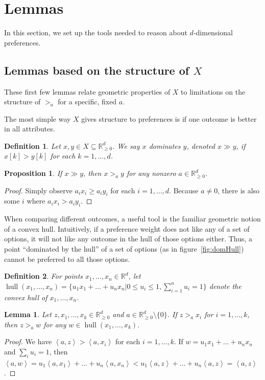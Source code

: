\documentclass[12pt]{article}
\newtheorem*{definition}{Definition}
\newtheorem{proposition}[theorem]{Proposition}
\newtheorem{lemma}[theorem]{Lemma}
\newcommand{\R}{\mathbb{R}}
\newcommand{\Rgz}{\mathbb{R}_{\ge 0}}
\newcommand{\ip}[2]{\left\langle{#1},{#2}\right\rangle}
\DeclareMathOperator*{\hull}{hull}
\newcommand{\1}[1]{\mathds{1}[{#1}]}
\begin{document}
\section{Lemmas}
  In this section, we set up the tools needed to reason about 
  $d$-dimensional preferences.

  \subsection{Lemmas based on the structure of $X$}
    These first few lemmas relate geometric properties of $X$ to
    limitations on the structure of $>_a$ for a specific, fixed $a$.

    The most simple way $X$ gives structure to preferences is if
    one outcome is better in all attributes.
    \begin{definition}
      Let $x,y\in X\subseteq \Rgz^d$.
      We say $x$ \emph{dominates} $y$, denoted $x\gg y$,
      if $x[k] > y[k]$ for each $k=1,\ldots,d$.
    \end{definition}
    \begin{proposition}
      If $x \gg y$, then $x >_a y$ for any nonzero $a\in \Rgz^d$.
    \end{proposition}
    \begin{proof}
      Simply observe $a_i x_i \ge a_i y_i$ for each $i=1,\ldots, d$.
      Because $a\ne 0$, there is also some $i$ where $a_i x_i > a_i y_i$.
    \end{proof}

    When comparing different outcomes, a useful tool is
    the familiar geometric notion of a convex hull.
    Intuitively, if a preference weight does not like any of a set of options,
    it will not like any outcome in the hull of those options either.
    Thus, a point ``dominated by the hull'' of a set of options
    (as in figure~\ref{fig:domHull}) cannot be preferred to all those options.
    \begin{definition}
      For points $x_1,\ldots,x_n \in \R^d$, let $\hull(x_1,\ldots,x_n)
      = \{u_1x_1 + \ldots + u_nx_n | 0\le u_i\le 1, \sum_{i=1}^n u_i = 1\}$
      denote the convex hull of $x_1,\ldots,x_n$.
    \end{definition}
    \begin{lemma}\label{lem:agreementHull}
      Let $z,x_1,\ldots,x_k \in \Rgz^d$ and $a\in \Rgz^d \setminus \{0\}$.
      If $z >_a x_i$ for $i=1,\ldots,k$, then $z >_a w$
      for any $w\in \hull(x_1,\ldots,x_k)$.
    \end{lemma}
    \begin{proof}
      We have $\ip{a}{z} > \ip{a}{x_i}$ for each $i=1,\ldots,k$.
      If $w = u_1x_1+ \ldots + u_nx_n$ and $\sum_i u_i =1$, then
      $\ip{a}{w} = u_1\ip{a}{x_1}+\ldots+u_n\ip{a}{x_n}
      < u_1\ip{a}{z} + \ldots + u_n\ip{a}{z} = \ip{a}{z}$.
    \end{proof}
\end{document}

